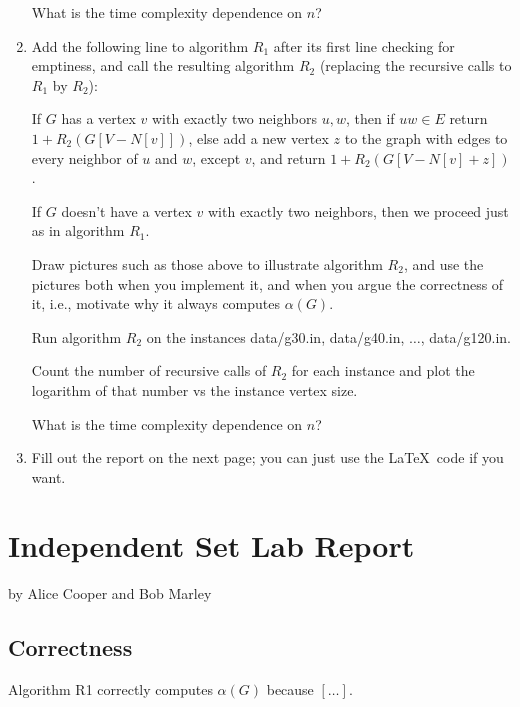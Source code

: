 \documentclass{tufte-handout}
\begin{document}
\begin{enumerate}
  What is the time complexity dependence on $n$?

\item Add the following line to algorithm $R_1$ after its first line
  checking for emptiness, and call the resulting algorithm $R_2$
  (replacing the recursive calls to $R_1$ by $R_2$):
 
  If $G$ has a vertex $v$ with exactly two neighbors $u,w$, then if
  $uw\in E$ return $1+R_2(G[V-N[v]])$, else add a new vertex $z$ to
  the graph with edges to every neighbor of $u$ and $w$, except $v$,
  and return $1+R_2(G[V-N[v]+z])$.

  If $G$ doesn't have a vertex $v$ with exactly two neighbors, then we
  proceed just as in algorithm $R_1$.
 
  Draw pictures such as those above to illustrate algorithm $R_2$, and
  use the pictures both when you implement it, and when you argue the
  correctness of it, i.e., motivate why it always computes
  $\alpha(G)$.
 
  Run algorithm $R_2$ on the instances data/g30.in, data/g40.in,
  $\ldots$, data/g120.in.

  Count the number of recursive calls of $R_2$ for each instance and plot the
  logarithm of that number vs the instance vertex size. 
  
  What is the time complexity dependence on $n$?

\item Fill out the report on the next page; you can just use the
  \LaTeX\ code if you want.
\end{enumerate}

\newpage


\newpage
\section{Independent Set Lab Report}


by Alice Cooper and Bob Marley

\subsection{Correctness}
Algorithm R1 correctly computes $\alpha(G)$ because $[\ldots]$.
\end{document}

